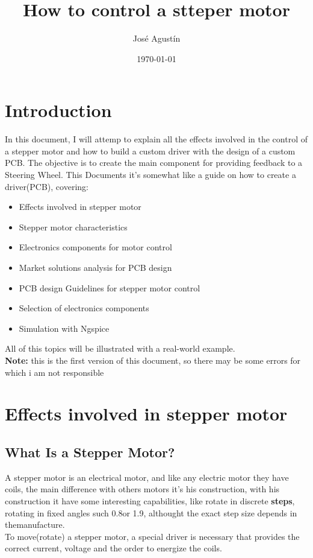 \documentclass{report}
\title{How to control a stteper motor}
\author{José Agustín}
\date{\today}
\begin{document}
\maketitle 

\tableofcontents 

\chapter{Introduction}
In this document, I will attemp to explain all the effects involved in the control
of a stepper motor and how to build a custom driver with the design of a custom PCB.
The objective is to create the main component for providing feedback to a Steering Wheel.
This Documents it's somewhat like a guide on how to create a driver(PCB), covering:
\begin{itemize}
\item Effects involved in stepper motor
\item Stepper motor characteristics
\item Electronics components for motor control
\item Market solutions analysis for PCB design
\item PCB design Guidelines for stepper motor control
\item Selection of electronics components
\item Simulation with Ngspice
\end{itemize}
All of this topics will be illustrated with a real-world example.\\
\textbf{Note:} this is the first version of this document, so there may be 
some errors for which i am not responsible

\chapter{Effects involved in stepper motor}
\section{What Is a Stepper Motor?}
A stepper motor is an electrical motor, and like any electric motor they have coils, the main 
difference with others motors it's his construction, with his construction it have some interesting
capabilities, like rotate in discrete \textbf{steps}, rotating in fixed angles such 0.8\degree or 
1.9\degree, althought the exact step size depends in themanufacture.\\
To move(rotate) a stepper motor, a special driver is necessary that provides the correct current, voltage and
the order to energize the coils.
\end{document}

